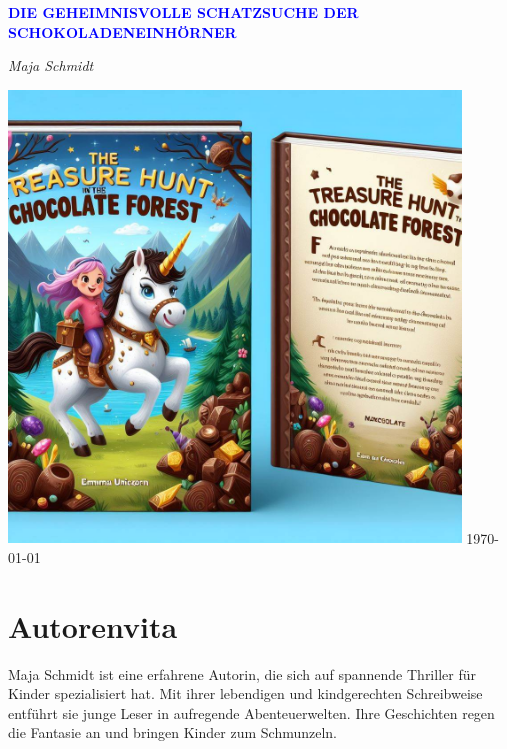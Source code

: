 \documentclass[12pt]{article} %
\begin{document}
\begin{titlepage}
    \centering
    \vspace*{3cm}
    {\Huge\bfseries\textcolor{blue}{\MakeUppercase{ Die geheimnisvolle Schatzsuche der Schokoladeneinhörner }}\par} %
    \vspace{0.5cm} %
    {\Large\textit{ Maja Schmidt }\par} %
    \vfill
    \includegraphics[width=0.9\textwidth]{ cover.jpg } %
    \vfill
    \today
\end{titlepage}

\section*{Autorenvita}
\vspace{4cm} %
\begin{minipage}{\textwidth}
    Maja Schmidt ist eine erfahrene Autorin, die sich auf spannende Thriller für Kinder spezialisiert hat. Mit ihrer lebendigen und kindgerechten Schreibweise entführt sie junge Leser in aufregende Abenteuerwelten. Ihre Geschichten regen die Fantasie an und bringen Kinder zum Schmunzeln.
\end{minipage}
\end{document}
